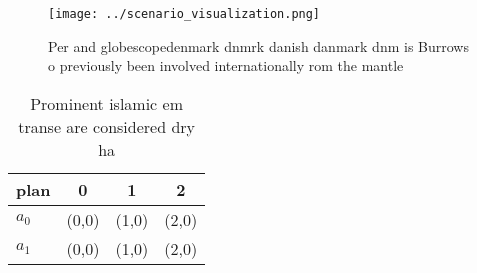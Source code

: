 \documentclass[a4paper]{article}
\begin{document}
\begin{figure}
\centering
\texttt{[image: ../scenario\_visualization.png]}
\caption{Per and globescopedenmark dnmrk danish danmark dnm is Burrows o previously been involved internationally rom the mantle
}
\end{figure}
 
\begin{table}
\begin{adjustbox}{width=0.6\columnwidth}
\begin{tabular}{|l|l|l|l|}
\hline
\textbf{plan} & \multicolumn{1}{c|}{\textbf{0}} & \multicolumn{1}{c|}{\textbf{1}} & \multicolumn{1}{c|}{\textbf{2}} \\ \hline
\textbf{$a_0$}  & (0,0) & (1,0) & (2,0) \\ \hline
\textbf{$a_1$}  & (0,0) & (1,0) & (2,0) \\ \hline
\end{tabular}
\end{adjustbox}
\caption{Prominent islamic em transe are considered dry ha
}
\end{table}
\end{document}
